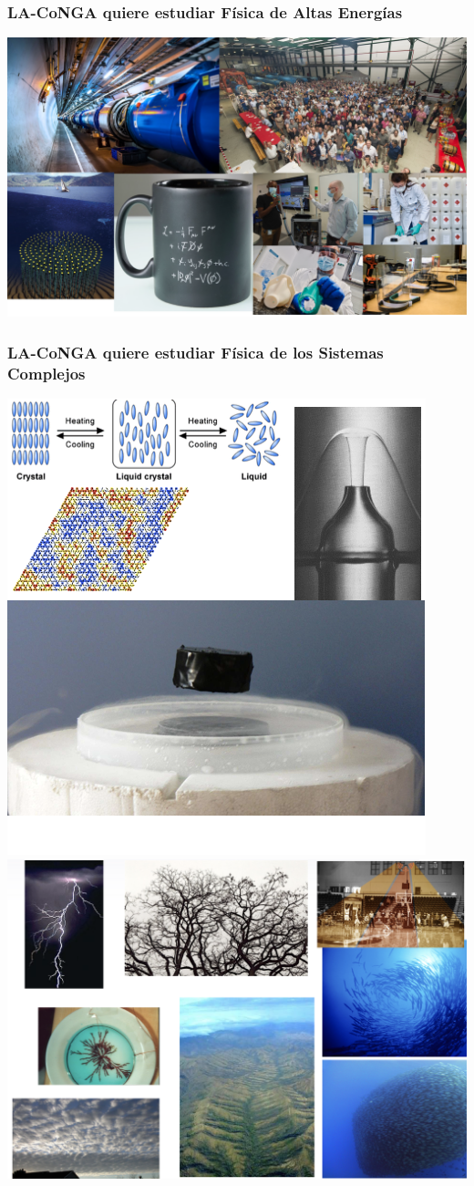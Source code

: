 \begin{frame}[fragile]
\frametitle{LA-CoNGA quiere estudiar Física de Altas Energías}
\begin{center}
\includegraphics[scale=0.91]{imagenes/fisicaAE.png}
\end{center}
\end{frame}


\begin{frame}[fragile]
\frametitle{LA-CoNGA quiere estudiar Física de los Sistemas Complejos}
\begin{center}
\includegraphics[scale=0.9]{imagenes/fisicaSC1.png}
\includegraphics[scale=0.2]{imagenes/fisicaSC2.png}
\end{center}
\end{frame}


